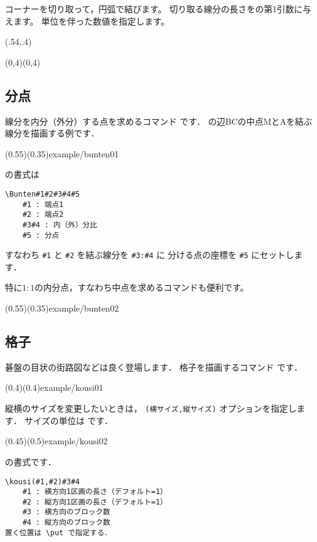 コーナーを切り取って，円弧で結びます。
切り取る線分の長さをの第1引数に与えます。
単位を伴った数値を指定します。

\begin{showEx}(.54,.4){}
  \begin{zahyou*}%
      [ul=10mm,Ueyohaku=1em,
        Hidariyohaku=1em,%
        Sitayohaku=1em]%
      (0,4)(0,4)
    \ovalTakakkei{5mm}{\A\B\C\D}
  \end{zahyou*}
\end{showEx}


\subsection{分点}
線分を内分（外分）する点を求めるコマンド  です．
 の辺BCの中点MとAを結ぶ線分を描画する例です．

(0.55)(0.35){example/bunten01}

 の書式は
\begin{boxnote}
\begin{verbatim}
\Bunten#1#2#3#4#5
    #1 : 端点1
    #2 : 端点2
    #3#4 : 内（外）分比
    #5 : 分点
\end{verbatim}
\end{boxnote}
すなわち \verb+#1+ と \verb+#2+ を結ぶ線分を \verb+#3:#4+ に
分ける点の座標を \verb+#5+ にセットします．

特に$1:1$の内分点，すなわち中点を求めるコマンドも便利です。

(0.55)(0.35){example/bunten02}

\subsection{格子}
碁盤の目状の街路図などは良く登場します．
格子を描画するコマンド  です．

(0.4)(0.4){example/kousi01}

縦横のサイズを変更したいときは，
\texttt{(横サイズ,縦サイズ)} オプションを指定します．
サイズの単位は  です．

(0.45)(0.5){example/kousi02}

 の書式です．

\begin{boxnote}
\begin{verbatim}
\kousi(#1,#2)#3#4
    #1 : 横方向1区画の長さ（デフォルト=1）
    #2 : 縦方向1区画の長さ（デフォルト=1）
    #3 : 横方向のブロック数
    #4 : 縦方向のブロック数
置く位置は \put で指定する．
\end{verbatim}
\end{boxnote}

